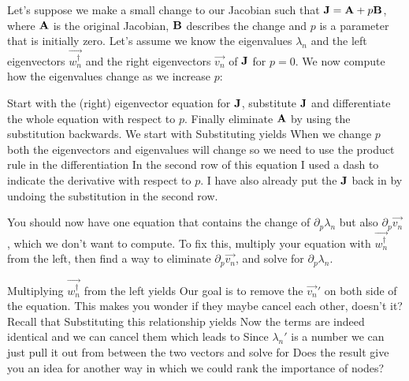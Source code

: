 Let's suppose we make a small change to our Jacobian such that ${\bf J}={\bf A}+p{\bf B}$, where ${\bf A}$ is the original Jacobian, ${\bf B}$ describes  the change and $p$ is a parameter that is initially zero. Let's assume we know the eigenvalues $\lambda_n$ and the left eigenvectors $\vec{w_n^\dag}$ and the right eigenvectors $\vec{v_n}$ of $\bf J$ for $p=0$. We now compute how the eigenvalues change as we increase $p$:

\subquestion 
Start with the (right) eigenvector equation for $\bf J$, substitute $\bf J$ and differentiate the whole equation with respect to $p$. Finally eliminate $\bf A$ by using the substitution backwards.  
\solution 
We start with 
Substituting 
yields 
When we change $p$ both the eigenvectors and eigenvalues will change so we need to use the product rule in the differentiation 
In the second row of this equation I used a dash to indicate the derivative with respect to $p$. I have also already put the $\bf J$ back in by undoing the substitution in the second row.

\subquestion You should now have one equation that contains the change of $\partial_p \lambda_n$ but also $\partial_p \vec{v_n}$, which we don't want to compute. To fix this, multiply your equation with $\vec{w_n^\dag}$ from the left, then find a way to eliminate $\partial_p \vec{v_n}$, and solve for $\partial_p \lambda_n$.  

\solution 
Multiplying $\vec{w_n^\dag}$ from the left yields
Our goal is to remove the $\vec{v_n}'$ on both side of the equation. This makes you wonder if they maybe cancel each other, doesn't it? Recall that
Substituting this relationship yields 
Now the terms are indeed identical and we can cancel them which leads to  
Since $\lambda_n'$ is a number we can just pull it out from between the two vectors and solve for 
\subquestion Does the result give you an idea for another way in which we could rank the importance of nodes?

